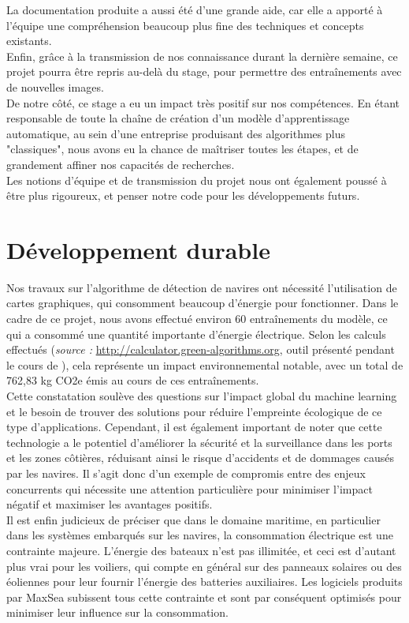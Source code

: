 La documentation produite a aussi été d'une grande aide, car elle a apporté à l'équipe une compréhension 
beaucoup plus fine des techniques et concepts existants. \\

Enfin, grâce à la transmission de nos connaissance durant la dernière semaine, 
ce projet pourra être repris au-delà du stage, pour permettre des 
entraînements avec de nouvelles images. \\

De notre côté, ce stage a eu un impact très positif sur nos compétences. 
En étant responsable de toute la chaîne de création d'un modèle d'apprentissage 
automatique, au sein d'une entreprise produisant des algorithmes plus "classiques", 
nous avons eu la chance de maîtriser toutes les étapes, et de grandement affiner
nos capacités de recherches.\\

Les notions d'équipe et de transmission du projet nous ont également poussé à être plus 
rigoureux, et penser notre code pour les développements futurs. 

\section{Développement durable}

Nos travaux sur l'algorithme de détection de navires ont nécessité l'utilisation 
de cartes graphiques, qui consomment beaucoup d'énergie pour fonctionner. 
Dans le cadre de ce projet, nous avons effectué environ 60 entraînements du modèle, 
ce qui a consommé une quantité importante d'énergie électrique. 
Selon les calculs effectués (\textit{source : }\url{http://calculator.green-algorithms.org}, 
outil présenté pendant le cours de ), 
cela représente un impact environnemental notable, 
avec un total de 762,83 kg CO2e émis au cours de ces entraînements. \\

Cette constatation soulève des questions sur l'impact global du machine learning 
et le besoin de trouver des solutions pour réduire l'empreinte écologique de ce type d'applications. 
Cependant, il est également important de noter que cette technologie a le potentiel 
d'améliorer la sécurité et la surveillance dans les ports et les zones côtières, 
réduisant ainsi le risque d'accidents et de dommages causés par les navires. 
Il s'agit donc d'un exemple de compromis entre des enjeux concurrents qui 
nécessite une attention particulière pour minimiser l'impact négatif et maximiser les avantages positifs.\\

Il est enfin judicieux de préciser que dans le domaine maritime, en particulier dans les systèmes
embarqués sur les navires, la consommation électrique est une contrainte majeure. L'énergie des
bateaux n'est pas illimitée, et ceci est d'autant plus vrai pour les voiliers, qui compte en général
sur des panneaux solaires ou des éoliennes pour leur fournir l'énergie des batteries auxiliaires. 
Les logiciels produits par MaxSea subissent tous cette contrainte et sont par conséquent 
optimisés pour minimiser leur influence sur la consommation. 